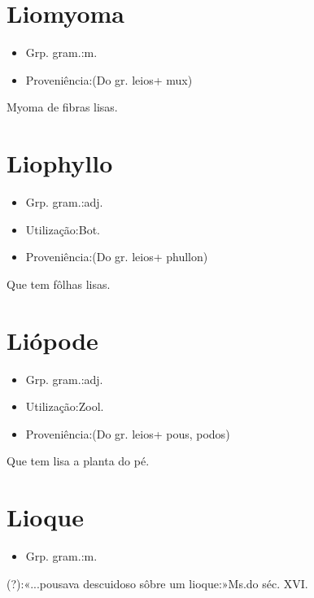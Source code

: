 \section{Liomyoma}
\begin{itemize}
\item {Grp. gram.:m.}
\end{itemize}
\begin{itemize}
\item {Proveniência:(Do gr. \textunderscore leios\textunderscore  + \textunderscore mux\textunderscore )}
\end{itemize}
Myoma de fibras lisas.
\section{Liophyllo}
\begin{itemize}
\item {Grp. gram.:adj.}
\end{itemize}
\begin{itemize}
\item {Utilização:Bot.}
\end{itemize}
\begin{itemize}
\item {Proveniência:(Do gr. \textunderscore leios\textunderscore  + \textunderscore phullon\textunderscore )}
\end{itemize}
Que tem fôlhas lisas.
\section{Liópode}
\begin{itemize}
\item {Grp. gram.:adj.}
\end{itemize}
\begin{itemize}
\item {Utilização:Zool.}
\end{itemize}
\begin{itemize}
\item {Proveniência:(Do gr. \textunderscore leios\textunderscore  + \textunderscore pous\textunderscore , \textunderscore podos\textunderscore )}
\end{itemize}
Que tem lisa a planta do pé.
\section{Lioque}
\begin{itemize}
\item {Grp. gram.:m.}
\end{itemize}
(?):«\textunderscore ...pousava descuidoso sôbre um lioque:\textunderscore »\textunderscore Ms.\textunderscore  do séc. XVI.
